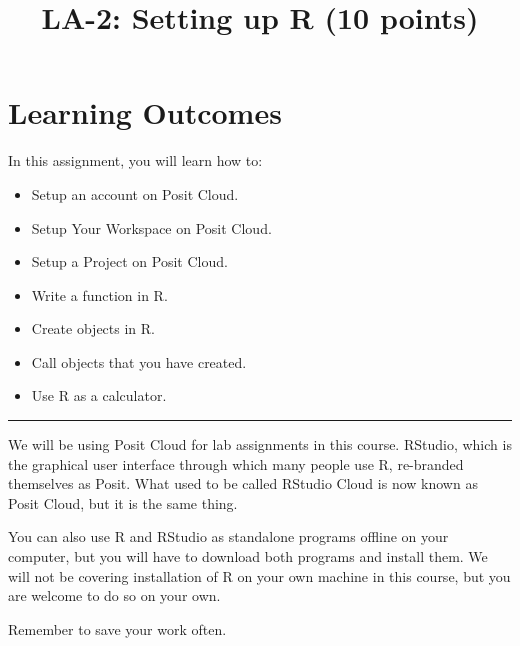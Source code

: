 \documentclass[
]{article}
\title{LA-2: Setting up R (10 points)}
\author{}
\date{}
\providecommand{\tightlist}{%
  \setlength{\itemsep}{0pt}\setlength{\parskip}{0pt}}
\begin{document}
\maketitle


\section{Learning Outcomes}\label{learning-outcomes}

In this assignment, you will learn how to:

\begin{itemize}
\tightlist
\item
  Setup an account on Posit Cloud.
\item
  Setup Your Workspace on Posit Cloud.
\item
  Setup a Project on Posit Cloud.
\item
  Write a function in R.
\item
  Create objects in R.
\item
  Call objects that you have created.
\item
  Use R as a calculator.
\end{itemize}

\begin{center}\rule{0.5\linewidth}{0.5pt}\end{center}

We will be using Posit Cloud for lab assignments in this course.
RStudio, which is the graphical user interface through which many people
use R, re-branded themselves as Posit. What used to be called RStudio
Cloud is now known as Posit Cloud, but it is the same thing.

You can also use R and RStudio as standalone programs offline on your
computer, but you will have to download both programs and install them.
We will not be covering installation of R on your own machine in this
course, but you are welcome to do so on your own.

\begin{tcolorbox}[enhanced jigsaw, arc=.35mm, bottomrule=.15mm, bottomtitle=1mm, breakable, colback=white, colbacktitle=quarto-callout-tip-color!10!white, colframe=quarto-callout-tip-color-frame, coltitle=black, left=2mm, leftrule=.75mm, opacityback=0, opacitybacktitle=0.6, rightrule=.15mm, title=\textcolor{quarto-callout-tip-color}{\faLightbulb}\hspace{0.5em}{Tip}, titlerule=0mm, toprule=.15mm, toptitle=1mm]

Remember to save your work often.

\end{tcolorbox}
\end{document}
